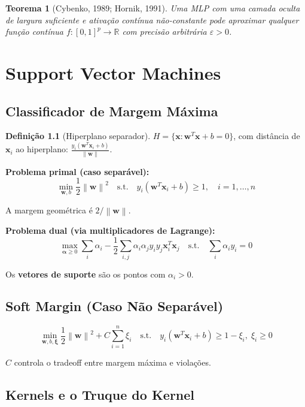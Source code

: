 \documentclass[12pt,a4paper,twoside]{book}
\newtheorem{teorema}{Teorema}[chapter]
\theoremstyle{definition}
\newtheorem{definicao}{Definição}[chapter]
\theoremstyle{remark}
\newcommand{\R}{\mathbb{R}}
\newcommand{\bx}{\bm{x}}
\newcommand{\bw}{\bm{w}}
\newcommand{\norm}[1]{\left\|#1\right\|}
\begin{document}
\begin{teorema}[Cybenko, 1989; Hornik, 1991]
Uma MLP com uma camada oculta de largura suficiente e ativação contínua não-constante pode aproximar qualquer função contínua $f: [0,1]^p \to \R$ com precisão arbitrária $\varepsilon > 0$.
\end{teorema}

\chapter{Support Vector Machines}

\section{Classificador de Margem Máxima}

\begin{definicao}[Hiperplano separador]
$H = \{\bx : \bw^T\bx + b = 0\}$, com distância de $\bx_i$ ao hiperplano: $\frac{y_i(\bw^T\bx_i + b)}{\norm{\bw}}$.
\end{definicao}

\textbf{Problema primal (caso separável):}
\[
\min_{\bw, b} \frac{1}{2}\norm{\bw}^2 \quad \text{s.t.} \quad y_i(\bw^T\bx_i + b) \geq 1, \quad i=1,\ldots,n
\]

A margem geométrica é $2/\norm{\bw}$.

\textbf{Problema dual (via multiplicadores de Lagrange):}
\[
\max_{\bm{\alpha} \geq 0} \sum_i \alpha_i - \frac{1}{2}\sum_{i,j}\alpha_i\alpha_j y_i y_j \bx_i^T\bx_j \quad \text{s.t.} \quad \sum_i \alpha_i y_i = 0
\]

Os \textbf{vetores de suporte} são os pontos com $\alpha_i > 0$.

\section{Soft Margin (Caso Não Separável)}

\[
\min_{\bw,b,\bm{\xi}} \frac{1}{2}\norm{\bw}^2 + C\sum_{i=1}^n \xi_i \quad \text{s.t.} \quad y_i(\bw^T\bx_i+b) \geq 1-\xi_i,\; \xi_i \geq 0
\]

$C$ controla o tradeoff entre margem máxima e violações.

\section{Kernels e o Truque do Kernel}
\end{document}
